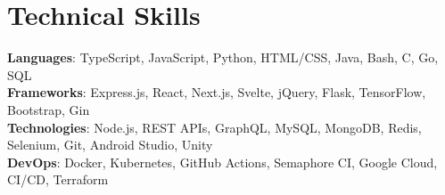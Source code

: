 \section{Technical Skills}
    \begin{itemize}[leftmargin=0.15in, label={}]
	\small{\item{
		\textbf{Languages}{: TypeScript, JavaScript, Python, HTML/CSS, Java, Bash, C, Go, SQL} \\
		\textbf{Frameworks}{: Express.js, React, Next.js, Svelte, jQuery, Flask, TensorFlow, Bootstrap, Gin} \\
		\textbf{Technologies}{: Node.js, REST APIs, GraphQL, MySQL, MongoDB, Redis, Selenium, Git, Android Studio, Unity} \\
		\textbf{DevOps}{: Docker, Kubernetes, GitHub Actions, Semaphore CI, Google Cloud, CI/CD, Terraform}
	}}
    \end{itemize}